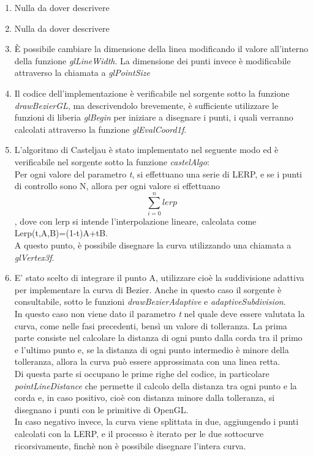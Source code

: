 \begin{enumerate}
     \item Nulla da dover descrivere
     \item Nulla da dover descrivere
     \item È possibile cambiare la dimensione della linea modificando il valore all'interno della funzione \textit{glLineWidth}. La dimensione dei punti invece è modificabile attraverso la chiamata a \textit{glPointSize}
     \item Il codice dell'implementazione è verificabile nel sorgente sotto la funzione \textit{drawBezierGL}, ma descrivendolo brevemente, è sufficiente utilizzare le funzioni di liberia \textit{glBegin} per iniziare a disegnare i punti, i quali verranno calcolati attraverso la funzione \textit{glEvalCoord1f}. 
     \item L'algoritmo di Casteljau è stato implementato nel seguente modo ed è verificabile nel sorgente sotto la funzione \textit{castelAlgo}:\\ 
     Per ogni valore del parametro \textit{t}, si effettuano una serie di LERP, e se i punti di controllo sono N, allora per ogni valore si effettuano $$\sum_{i=0}^{n} lerp$$, dove con lerp si intende l'interpolazione lineare, calcolata come Lerp(t,A,B)=(1-t)A+tB.\\
     A questo punto, è possibile disegnare la curva utilizzando una chiamata a \textit{glVertex3f}.
    \item E' stato scelto di integrare il punto A, utilizzare cioè la suddivisione adattiva per implementare la curva di Bezier. Anche in questo caso il sorgente è consultabile, sotto le funzioni \textit{drawBezierAdaptive} e \textit{adaptiveSubdivision}.\\
    In questo caso non viene dato il parametro \textit{t} nel quale deve essere valutata la curva, come nelle fasi precedenti, bensì un valore di tolleranza.
    La prima parte consiste nel calcolare la distanza di ogni punto dalla corda tra il primo e l'ultimo punto e, se la distanza di ogni punto intermedio è minore della tolleranza, allora la curva può essere approssimata con una linea retta.\\
    Di questa parte si occupano le prime righe del codice, in particolare \textit{pointLineDistance} che
    permette il calcolo della distanza tra ogni punto e la corda e, in caso positivo, cioè con distanza minore dalla tolleranza, si disegnano i punti con le primitive di OpenGL.\\
    In caso negativo invece, la curva viene splittata in due, aggiungendo i punti calcolati con la LERP, e il processo è iterato per le due sottocurve ricorsivamente, finchè non è possibile disegnare l'intera curva.

\end{enumerate}
